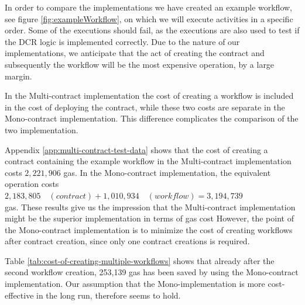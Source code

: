 \documentclass{article}
\begin{document}
	In order to compare the implementations we have created an example workflow, see figure \ref{fig:exampleWorkflow}, on which we will execute activities in a specific order. Some of the executions should fail, as the executions are also used to test if the DCR logic is implemented correctly.
	Due to the nature of our implementations, we anticipate that the act of creating the contract and subsequently the workflow will be the most expensive operation, by a large margin.

	In the Multi-contract implementation the cost of creating a workflow is included in the cost of deploying the contract, while these two costs are separate in the Mono-contract implementation.
	This difference complicates the comparison of the two implementation.

	Appendix \ref{app:multi-contract-test-data} shows that the cost of creating a contract containing the example workflow in the Multi-contract implementation costs $2,221,906$ gas.
	In the Mono-contract implementation, the equivalent operation costs \\

	$2,183,805\quad(contract) + 1,010,934\quad(workflow) = 3,194,739$ \\

	\noindent gas. These results give us the impression that the Multi-contract implementation might be the superior implementation in terms of gas cost
	However, the point of the Mono-contract implementation is to minimize the cost of creating workflows after contract creation, since only one contract creations is required. 

	Table \ref{tab:cost-of-creating-multiple-workflows} shows that already after the second workflow creation, 253,139 gas has been saved by using the Mono-contract implementation.
	Our assumption that the Mono-implementation is more cost-effective in the long run, therefore seems to hold.  
\end{document}
